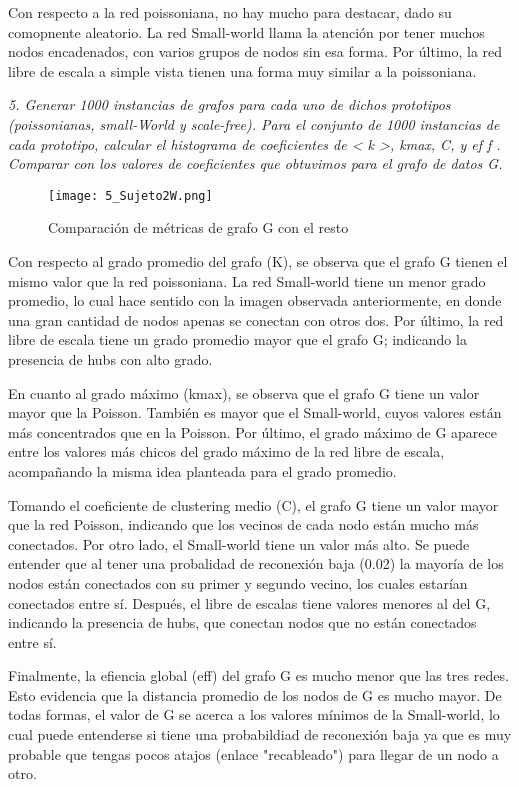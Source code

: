 \documentclass{article}
\begin{document}
Con respecto a la red poissoniana, no hay mucho para destacar, 
dado su comopnente aleatorio. La red Small-world llama la atención por
tener muchos nodos encadenados, con varios grupos de nodos sin esa
forma. Por último, la red libre de escala a simple vista tienen una forma
muy similar a la poissoniana.

\textit{5. Generar 1000 instancias de grafos para cada uno de dichos prototipos (poissonianas,
small-World y scale-free). Para el conjunto de 1000 instancias de cada prototipo, calcular el histograma de coeﬁcientes de < k >, kmax, C, y ef f . Comparar con los valores
de coeﬁcientes que obtuvimos para el grafo de datos G.}

\begin{figure}[H]
  \centering  
  \texttt{[image: 5\_Sujeto2W.png]}
  \caption{Comparación de métricas de grafo G con el resto}
\end{figure}

Con respecto al grado promedio del grafo (K), se observa que el grafo G tienen el mismo valor que
la red poissoniana. La red Small-world tiene un menor grado promedio, lo cual hace sentido
con la imagen observada anteriormente, en donde una gran cantidad de nodos apenas se conectan
con otros dos. Por último, la red libre de escala tiene un grado promedio mayor que el grafo G;
indicando la presencia de hubs con alto grado.

En cuanto al grado máximo (kmax), se observa que el grafo G tiene un valor mayor que la Poisson.
También es mayor que el Small-world, cuyos valores están más concentrados que en la Poisson.
Por último, el grado máximo de G aparece entre los valores más chicos del grado máximo de la 
red libre de escala, acompañando la misma idea planteada para el grado promedio.

Tomando el coeficiente de clustering medio (C), el grafo G tiene un valor mayor que la red Poisson,
indicando que los vecinos de cada nodo están mucho más conectados. Por otro lado, el Small-world
tiene un valor más alto. Se puede entender que al tener una probalidad de reconexión baja (0.02)
la mayoría de los nodos están conectados con su primer y segundo vecino, los cuales estarían
conectados entre sí. Después, el libre de escalas tiene valores menores al del G, indicando
la presencia de hubs, que conectan nodos que no están conectados entre sí.

Finalmente, la efiencia global (eff) del grafo G es mucho menor que las tres redes. Esto evidencia
que la distancia promedio de los nodos de G es mucho mayor. De todas formas, el valor de G se acerca
a los valores mínimos de la Small-world, lo cual puede entenderse si tiene una probabildiad de reconexión
baja ya que es muy probable que tengas pocos atajos (enlace "recableado") para llegar de un nodo a otro.
\end{document}
